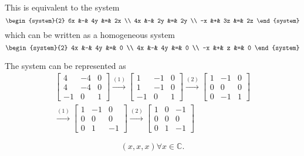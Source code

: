 \documentclass{article}
\begin{document}
\begin{enumerate}[listparindent=\parindent]
\begin{enumerate}
    This is equivalent to the system
    \[
        \begin{system}{2}
            6x &-& 4y &=& 2x \\
            4x &-& 2y &=& 2y \\
            -x &+& 3z &=& 2z
        \end{system}
    \]
    which can be written as a homogeneous system
    \[
        \begin{system}{2}
            4x &-& 4y &=& 0 \\
            4x &-& 4y &=& 0 \\
            -x &+& z &=& 0
        \end{system}
    \]

    The system can be represented as
    \begin{gather*}
        \begin{bmatrix}
            4 & -4 & 0 \\
            4 & -4 & 0 \\
            -1 & 0 & 1
        \end{bmatrix}
        \xrightarrow{(1)}
        \begin{bmatrix}
            1 & -1 & 0 \\
            1 & -1 & 0 \\
            -1 & 0 & 1
        \end{bmatrix}
        \xrightarrow{(2)}
        \begin{bmatrix}
            1 & -1 & 0 \\
            0 & 0 & 0 \\
            0 & -1 & 1
        \end{bmatrix} \\
        \xrightarrow{(1)}
        \begin{bmatrix}
            1 & -1 & 0 \\
            0 & 0 & 0 \\
            0 & 1 & -1
        \end{bmatrix}
        \xrightarrow{(2)}
        \begin{bmatrix}
            1 & 0 & -1 \\
            0 & 0 & 0 \\
            0 & 1 & -1
        \end{bmatrix}
    \end{gather*}

    \[ \boxed {
        (x, x, x) \forall x \in \mathbb C.
    } \]


\end{enumerate}
\end{enumerate}
\end{document}
